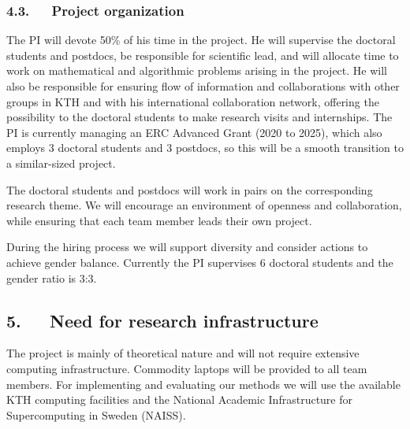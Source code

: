 \documentclass[a4paper,11pt]{article}
\begin{document}
\subsubsection*{4.3.~~~Project organization}


The PI will devote 50\% of his time in the project. 
He will supervise the doctoral students and postdocs, 
be responsible for scientific lead, 
and will allocate time to work on mathematical and algorithmic problems arising in the project.
He will also be responsible for ensuring flow of information and collaborations
with other groups in KTH and with his international collaboration network, 
offering the possibility to the doctoral students to make research visits and internships.
The PI is currently managing an ERC Advanced Grant (2020 to 2025),
which also employs 3 doctoral students and 3 postdocs, 
so this will be a smooth transition to a similar-sized project.

The doctoral students and postdocs will work in pairs on the corresponding research theme.
We will encourage an environment of openness and collaboration, 
while ensuring that each team member leads their own project.

During the hiring process we will support diversity and consider actions to achieve gender balance. 
Currently the PI supervises 6 doctoral students and the gender ratio is 3:3.

\subsection*{5.~~~Need for research infrastructure}


The project is mainly of theoretical nature and will not require extensive computing infrastructure. 
Commodity laptops will be provided to all team members. 
For implementing and evaluating our methods we will use the available 
KTH computing facilities
and the National Academic Infrastructure for Supercomputing in Sweden (NAISS).
\end{document}
